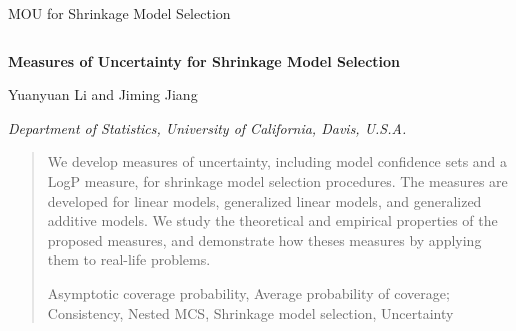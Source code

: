 \documentclass[12pt]{article} %
\theoremstyle{definition}
\begin{document}

\renewcommand{\baselinestretch}{2}


{\hfill {\footnotesize\rm MOU for Shrinkage Model Selection} \hfill}

\renewcommand{\thefootnote}{}
$\ $\par


\fontsize{12}{14pt plus.8pt minus .6pt}\selectfont \vspace{0.8pc}
\centerline{\large\bf Measures of Uncertainty for Shrinkage Model Selection}
\vspace{2pt} 

\centerline{Yuanyuan Li and Jiming Jiang} 
\vspace{.4cm} 
\centerline{\it Department of Statistics, University of California, Davis, U.S.A.}
 \vspace{.55cm} \fontsize{9}{11.5pt plus.8pt minus.6pt}\selectfont


\begin{quotation}
We develop measures of uncertainty, including model confidence sets and a LogP measure, for shrinkage model selection procedures. The measures are developed for linear models, generalized linear models, and generalized additive models. We study the theoretical and empirical properties of the proposed measures, and demonstrate how theses measures by applying them to real-life problems.

\vspace{9pt}
Asymptotic coverage probability, Average probability of coverage; Consistency, Nested MCS, Shrinkage model selection, Uncertainty
\par
\end{quotation}\par
\end{document}
